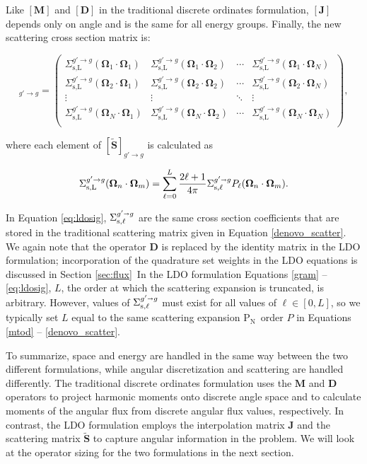 \documentclass{article} %
\newcommand{\sa}{\shortrightarrow}
\newcommand{\bo}{\mathbf\Omega}
\newcommand{\pn}{P$_\mathrm{N}$}
\newcommand{\ve}[1]{\ensuremath{\mathbf{#1}}}
\newcommand{\Sigg}[1]{\ensuremath{\Sigma^{g'\sa g}_{\text{s},#1}}}
\newcommand{\Sij}[2]{\Sigma^{g'\rightarrow g}_{\text{s,L}}(\bo_#1\cdot\bo_#2)}
\begin{document}
\noindent Like $[\ve{M}]$ and $[\ve{D}]$ in the traditional discrete ordinates
formulation, $[\ve{J}]$ depends only on angle and is the same for all 
energy groups. Finally, the new scattering cross section matrix is:

\begin{equation}
  [\ve{\tilde{S}}]_{g'\rightarrow g} = \begin{pmatrix}
    \Sij{1}{1} & \Sij{1}{2} & \cdots & \Sij{1}{N} \\
    \Sij{2}{1} & \Sij{2}{2} & \cdots & \Sij{2}{N} \\
    \vdots     & \vdots     & \ddots & \vdots     \\
    \Sij{N}{1} & \Sij{N}{2} & \cdots & \Sij{N}{N} \\
  \end{pmatrix},
\label{ldo_scatter}
\end{equation}

\noindent where each element of $[\ve{\tilde{S}}]_{g'\rightarrow g}$ is
calculated as

\begin{equation}
\Sij{n}{m} = \sum_{\ell=0}^L \frac{2\ell +1}{4\pi}\Sigg{\ell}
P_{\ell}(\bo_n \cdot\bo_m).
\label{eq:ldosig}
\end{equation}

\noindent In Equation \ref{eq:ldosig}, $\Sigg{\ell}$ are the same cross section 
coefficients that are stored in the traditional scattering matrix given in
Equation \ref{denovo_scatter}. We again note that the operator $\ve{D}$ is
replaced by the identity matrix in the LDO formulation; incorporation of the
quadrature set weights in the LDO equations is 
discussed in Section \ref{sec:flux}\ In the LDO formulation Equations
\ref{gram} -- \ref{eq:ldosig}, $L$, the order at which the scattering expansion
is truncated, is arbitrary. However, values of $\Sigg{\ell}$ must exist for all
values of $\ell \in [0,L]$, so we typically set $L$ equal to the same 
scattering expansion \pn\ order $P$ in Equations
\ref{mtod} -- \ref{denovo_scatter}.

To summarize, space and energy are handled in the same way between the two
different formulations, while angular discretization and scattering are handled
differently. The traditional discrete ordinates formulation uses the $\ve{M}$
and $\ve{D}$ operators to project harmonic moments onto discrete angle space
and to calculate moments of the angular flux from discrete angular flux values,
respectively. In contrast, the LDO formulation employs the interpolation matrix
$\ve{J}$ and the scattering matrix $\ve{\tilde{S}}$ to capture angular
information in the problem. We will look at the
operator sizing for the two formulations in the next section.
\end{document}
